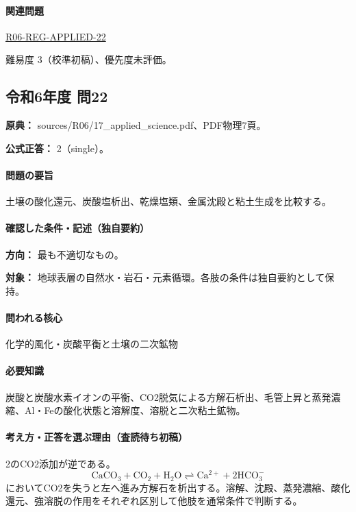 \paragraph{関連問題} \hyperref[q:r06-reg-applied-22]{R06-REG-APPLIED-22}

\par 難易度 3（校準初稿）、優先度未評価。

\subsection{令和6年度 問22}
\label{q:r06-reg-applied-22}

\noindent\textbf{原典：} sources/R06/17\_applied\_science.pdf、PDF物理7頁。

\textbf{公式正答：} 2（single）。

\paragraph{問題の要旨} 土壌の酸化還元、炭酸塩析出、乾燥塩類、金属沈殿と粘土生成を比較する。

\paragraph{確認した条件・記述（独自要約）}\mbox{}\par

\noindent\textbf{方向：} 最も不適切なもの。\par

\noindent\textbf{対象：} 地球表層の自然水・岩石・元素循環。各肢の条件は独自要約として保持。\par

\paragraph{問われる核心} 化学的風化・炭酸平衡と土壌の二次鉱物

\paragraph{必要知識} 炭酸と炭酸水素イオンの平衡、CO2脱気による方解石析出、毛管上昇と蒸発濃縮、Al・Feの酸化状態と溶解度、溶脱と二次粘土鉱物。

\paragraph{考え方・正答を選ぶ理由（査読待ち初稿）} 2のCO2添加が逆である。\[\mathrm{CaCO_3+CO_2+H_2O\rightleftharpoons Ca^{2+}+2HCO_3^-}\]においてCO2を失うと左へ進み方解石を析出する。溶解、沈殿、蒸発濃縮、酸化還元、強溶脱の作用をそれぞれ区別して他肢を通常条件で判断する。

